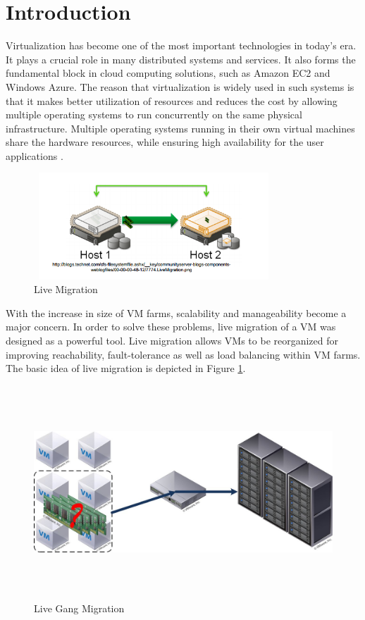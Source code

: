\documentclass{acm_proc_article-sp}
\begin{document}
\setlength{\parindent}{0.5cm}
\section{Introduction}
Virtualization has become one of the most important technologies in today's era. It plays a crucial role in many distributed systems and services. It also forms the fundamental block in cloud computing solutions, such as Amazon EC2 \cite{ec2} and Windows Azure\cite{azure}. The reason that virtualization is widely used in such systems is that it makes better utilization of resources and reduces the cost by allowing multiple operating systems to run concurrently on the same physical infrastructure. Multiple operating systems running in their own virtual machines share the hardware resources, while ensuring high availability for the user applications \cite{virt_app}.
\par
\begin{figure}[ht]
\centering
        \includegraphics[height=4cm,width=9cm]{images/live_migration.png}
    \caption{Live Migration}
    \label{fig:live_migration}
\end{figure}
\indent With the increase in size of VM farms, scalability and manageability become a major concern. In order to solve these problems, live migration of a VM was  designed as a powerful tool. Live migration allows VMs to be reorganized for improving reachability, fault-tolerance as well as load balancing within VM farms. The basic idea of live migration is depicted in Figure \ref{fig:live_migration}.
\par
\begin{figure}[ht]
\centering
        \includegraphics[height=8cm,width=18cm]{images/gang_migration.jpg}
    \caption{Live Gang Migration}
    \label{fig:gang_migration}
\end{figure}
\end{document}
